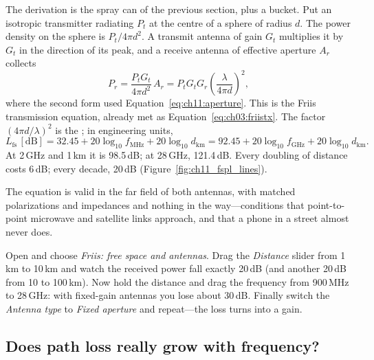 The derivation is the spray can of the previous section, plus a bucket. Put an isotropic
transmitter radiating $P_t$ at the centre of a sphere of radius $d$. The power density on the
sphere is $P_t/4\pi d^2$. A transmit antenna of gain $G_t$ multiplies it by $G_t$ in the direction
of its peak, and a receive antenna of effective aperture $A_r$ collects
\begin{equation}
P_r=\frac{P_tG_t}{4\pi d^2}\,A_r=P_tG_tG_r\left(\frac{\lambda}{4\pi d}\right)^2,
\label{eq:ch11:friis}
\end{equation}
where the second form used Equation~\eqref{eq:ch11:aperture}. This is the Friis transmission
equation, already met as Equation~\eqref{eq:ch03:friistx}. The factor $(4\pi d/\lambda)^2$ is the
; in engineering units,
\begin{equation}
L_{\text{fs}}\,[\mathrm{dB}]=32.45+20\log_{10}f_{\mathrm{MHz}}+20\log_{10}d_{\mathrm{km}}
=92.45+20\log_{10}f_{\mathrm{GHz}}+20\log_{10}d_{\mathrm{km}} .
\label{eq:ch11:fspl}
\end{equation}
At 2\,GHz and 1\,km it is 98.5\,dB; at 28\,GHz, 121.4\,dB. Every doubling of distance
costs 6\,dB; every decade, 20\,dB (Figure~\ref{fig:ch11_fspl_lines}).


 The equation is valid in the far field of both antennas, with
matched polarizations and impedances and nothing in the way---conditions that point-to-point
microwave and satellite links approach, and that a phone in a street almost never does.

\begin{tryit}
Open  and choose \emph{Friis: free space and antennas}. Drag
the \emph{Distance} slider from 1\,km to 10\,km and watch the received power fall exactly 20\,dB (and
another 20\,dB from 10 to 100\,km). Now hold the
distance and drag the frequency from 900\,MHz to 28\,GHz: with fixed-gain antennas you lose about
30\,dB. Finally switch the \emph{Antenna type} to \emph{Fixed aperture} and repeat---the loss turns
into a gain.
\end{tryit}

\subsection{Does path loss really grow with frequency?}

